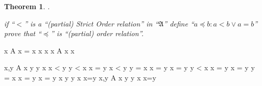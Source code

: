\documentclass[10pt,a4paper]{book}
\newtheorem{theorem}{Theorem}[section]
\begin{document}
\begin{theorem}.

    if ``$< $'' is a ``(partial) Strict Order relation'' in ``$\mathfrak{A}$''
    define ``$a \preceq b : a < b \lor a = b $'' prove that ``$\preceq $'' is
    ``(partial) order relation''.

\end{theorem}

\begin{fitchproof}[arrayenv=tabular]
    \open
     { x \in A }   
     { x = x }          
     { x \preceq x }     
    \close
     {\forall x \in A \quad x \preceq x }      
\end{fitchproof}

\begin{fitchproof}[arrayenv=tabular]
    \open
     { x,y \in A }      
    \open
     { x \preceq y \land y \preceq x }     
    \open
     { x < y \land y < x }     
     { \bot  }                          
     { x = y  }                       
    \close
    \open
     { x < y \land y = x }         
     { x = y  }                         
    \close
    \open
     { x = y \land y < x }          
     { x = y  }                        
    \close
    \open
     { x = y \land y = x }           
     { x = y  }                        
    \close
     { x = y  }                      
    \close
     { x \preceq y \land y \preceq x \to x=y }      
    \close
     {\forall x,y \in A \quad x \preceq y \land y \preceq x \to x=y }      
\end{fitchproof}
\end{document}
